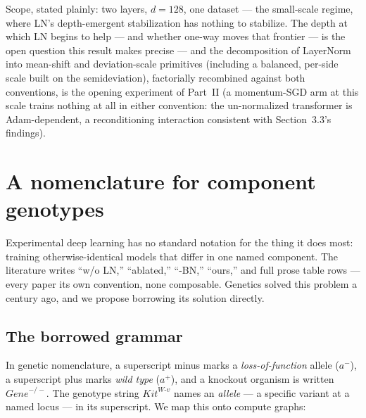 \documentclass[11pt]{article}
\begin{document}
Scope, stated plainly: two layers, $d{=}128$, one dataset ---
the small-scale regime, where LN's depth-emergent stabilization has
nothing to stabilize. The depth at which LN begins to help
--- and whether one-way moves that frontier --- is the open question
this result makes precise --- and the decomposition of LayerNorm
into mean-shift and deviation-scale primitives (including a
balanced, per-side scale built on the semideviation), factorially
recombined against both conventions, is the opening experiment of
Part~II (a momentum-SGD arm at this scale trains
nothing at all in either convention: the un-normalized transformer
is Adam-dependent, a reconditioning interaction consistent with
Section~3.3's findings).

\section{A nomenclature for component genotypes}
\label{sec:nomenclature}

Experimental deep learning has no standard notation for the thing it
does most: training otherwise-identical models that differ in one
named component. The literature writes ``w/o LN,'' ``ablated,''
``-BN,'' ``ours,'' and full prose table rows --- every paper its own
convention, none composable. Genetics solved this problem a century
ago, and we propose borrowing its solution directly.

\subsection{The borrowed grammar}

In genetic nomenclature, a superscript minus marks a
\emph{loss-of-function} allele ($a^{-}$), a superscript plus marks
\emph{wild type} ($a^{+}$), and a knockout organism is written
$\mathit{Gene}^{-/-}$. The genotype string
$\mathit{Kit}^{W\text{-}v}$ names an \emph{allele} --- a specific
variant at a named locus --- in its superscript. We map this onto
compute graphs:
\end{document}
